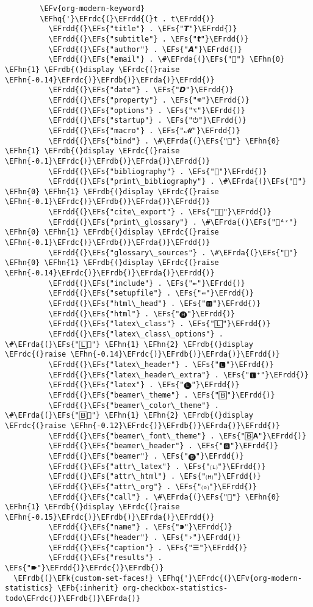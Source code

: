 \documentclass{article}
\newcommand{\EFs}[1]{\textcolor{EFs}{#1}} %
\newcommand{\EFk}[1]{\textcolor{EFk}{#1}} %
\newcommand{\EFb}[1]{\textcolor{EFb}{#1}} %
\newcommand{\EFv}[1]{\textcolor{EFv}{#1}} %
\newcommand{\EFhn}[1]{\textcolor{EFhn}{\textbf{#1}}} %
\newcommand{\EFhq}[1]{#1} %
\newcommand{\EFrda}[1]{\textcolor{EFrda}{#1}} %
\newcommand{\EFrdb}[1]{\textcolor{EFrdb}{#1}} %
\newcommand{\EFrdc}[1]{\textcolor{EFrdc}{#1}} %
\newcommand{\EFrdd}[1]{\textcolor{EFrdd}{#1}} %
\begin{document}
\begin{Code}
\begin{Verbatim}
        \EFv{org-modern-keyword}
        \EFhq{'}\EFrdc{(}\EFrdd{(}t . t\EFrdd{)}
          \EFrdd{(}\EFs{"title"} . \EFs{"𝙏"}\EFrdd{)}
          \EFrdd{(}\EFs{"subtitle"} . \EFs{"𝙩"}\EFrdd{)}
          \EFrdd{(}\EFs{"author"} . \EFs{"𝘼"}\EFrdd{)}
          \EFrdd{(}\EFs{"email"} . \#\EFrda{(}\EFs{""} \EFhn{0} \EFhn{1} \EFrdb{(}display \EFrdc{(}raise \EFhn{-0.14}\EFrdc{)}\EFrdb{)}\EFrda{)}\EFrdd{)}
          \EFrdd{(}\EFs{"date"} . \EFs{"𝘿"}\EFrdd{)}
          \EFrdd{(}\EFs{"property"} . \EFs{"☸"}\EFrdd{)}
          \EFrdd{(}\EFs{"options"} . \EFs{"⌥"}\EFrdd{)}
          \EFrdd{(}\EFs{"startup"} . \EFs{"⏻"}\EFrdd{)}
          \EFrdd{(}\EFs{"macro"} . \EFs{"𝓜"}\EFrdd{)}
          \EFrdd{(}\EFs{"bind"} . \#\EFrda{(}\EFs{""} \EFhn{0} \EFhn{1} \EFrdb{(}display \EFrdc{(}raise \EFhn{-0.1}\EFrdc{)}\EFrdb{)}\EFrda{)}\EFrdd{)}
          \EFrdd{(}\EFs{"bibliography"} . \EFs{""}\EFrdd{)}
          \EFrdd{(}\EFs{"print\_bibliography"} . \#\EFrda{(}\EFs{""} \EFhn{0} \EFhn{1} \EFrdb{(}display \EFrdc{(}raise \EFhn{-0.1}\EFrdc{)}\EFrdb{)}\EFrda{)}\EFrdd{)}
          \EFrdd{(}\EFs{"cite\_export"} . \EFs{"⮭"}\EFrdd{)}
          \EFrdd{(}\EFs{"print\_glossary"} . \#\EFrda{(}\EFs{"ᴬᶻ"} \EFhn{0} \EFhn{1} \EFrdb{(}display \EFrdc{(}raise \EFhn{-0.1}\EFrdc{)}\EFrdb{)}\EFrda{)}\EFrdd{)}
          \EFrdd{(}\EFs{"glossary\_sources"} . \#\EFrda{(}\EFs{""} \EFhn{0} \EFhn{1} \EFrdb{(}display \EFrdc{(}raise \EFhn{-0.14}\EFrdc{)}\EFrdb{)}\EFrda{)}\EFrdd{)}
          \EFrdd{(}\EFs{"include"} . \EFs{"⇤"}\EFrdd{)}
          \EFrdd{(}\EFs{"setupfile"} . \EFs{"⇚"}\EFrdd{)}
          \EFrdd{(}\EFs{"html\_head"} . \EFs{"🅷"}\EFrdd{)}
          \EFrdd{(}\EFs{"html"} . \EFs{"🅗"}\EFrdd{)}
          \EFrdd{(}\EFs{"latex\_class"} . \EFs{"🄻"}\EFrdd{)}
          \EFrdd{(}\EFs{"latex\_class\_options"} . \#\EFrda{(}\EFs{"🄻"} \EFhn{1} \EFhn{2} \EFrdb{(}display \EFrdc{(}raise \EFhn{-0.14}\EFrdc{)}\EFrdb{)}\EFrda{)}\EFrdd{)}
          \EFrdd{(}\EFs{"latex\_header"} . \EFs{"🅻"}\EFrdd{)}
          \EFrdd{(}\EFs{"latex\_header\_extra"} . \EFs{"🅻⁺"}\EFrdd{)}
          \EFrdd{(}\EFs{"latex"} . \EFs{"🅛"}\EFrdd{)}
          \EFrdd{(}\EFs{"beamer\_theme"} . \EFs{"🄱"}\EFrdd{)}
          \EFrdd{(}\EFs{"beamer\_color\_theme"} . \#\EFrda{(}\EFs{"🄱"} \EFhn{1} \EFhn{2} \EFrdb{(}display \EFrdc{(}raise \EFhn{-0.12}\EFrdc{)}\EFrdb{)}\EFrda{)}\EFrdd{)}
          \EFrdd{(}\EFs{"beamer\_font\_theme"} . \EFs{"🄱𝐀"}\EFrdd{)}
          \EFrdd{(}\EFs{"beamer\_header"} . \EFs{"🅱"}\EFrdd{)}
          \EFrdd{(}\EFs{"beamer"} . \EFs{"🅑"}\EFrdd{)}
          \EFrdd{(}\EFs{"attr\_latex"} . \EFs{"🄛"}\EFrdd{)}
          \EFrdd{(}\EFs{"attr\_html"} . \EFs{"🄗"}\EFrdd{)}
          \EFrdd{(}\EFs{"attr\_org"} . \EFs{"⒪"}\EFrdd{)}
          \EFrdd{(}\EFs{"call"} . \#\EFrda{(}\EFs{""} \EFhn{0} \EFhn{1} \EFrdb{(}display \EFrdc{(}raise \EFhn{-0.15}\EFrdc{)}\EFrdb{)}\EFrda{)}\EFrdd{)}
          \EFrdd{(}\EFs{"name"} . \EFs{"⁍"}\EFrdd{)}
          \EFrdd{(}\EFs{"header"} . \EFs{"›"}\EFrdd{)}
          \EFrdd{(}\EFs{"caption"} . \EFs{"☰"}\EFrdd{)}
          \EFrdd{(}\EFs{"results"} . \EFs{"🠶"}\EFrdd{)}\EFrdc{)}\EFrdb{)}
  \EFrdb{(}\EFk{custom-set-faces!} \EFhq{'}\EFrdc{(}\EFv{org-modern-statistics} \EFb{:inherit} org-checkbox-statistics-todo\EFrdc{)}\EFrdb{)}\EFrda{)}




\end{Verbatim}
\end{Code}
\end{document}
